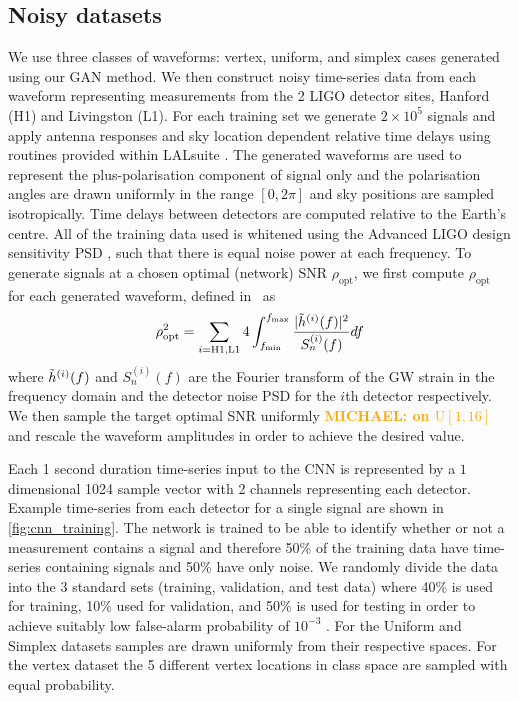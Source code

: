 \documentclass[12pt]{iopart}
\newcommand{\michael}[1]{\textbf{\textcolor{orange}{MICHAEL: #1}}}
\newcommand{\ndimensional}[1]{$#1$\nobreakdash\discretionary{-}{-}{-}dimensional}
\begin{document}
\subsection{Noisy datasets} 
We use three classes of waveforms: vertex, uniform, and simplex cases generated using our \ac{GAN} method. We then construct noisy time-series data from each waveform representing measurements from the 2 LIGO detector sites, Hanford (H1) and Livingston (L1). For each training set we generate $2\times 10^5$ signals and apply antenna responses and sky location dependent relative time delays using routines provided within LALsuite \cite{lalsuite}. The generated waveforms are used to represent the plus-polarisation component of signal only and the polarisation angles are drawn uniformly in the range $[0,2\pi]$ and sky positions are sampled isotropically. Time delays between detectors are computed relative to the Earth's centre. All of the training data used is whitened using the Advanced LIGO design sensitivity \ac{PSD} \cite{designcurve,observing-prospects}, such that there is equal noise power at each frequency. To generate  signals at a chosen optimal (network) \ac{SNR} $\rho_{\text{opt}}$, we first compute $\rho_{\text{opt}}$ for each generated waveform, defined in~\cite{PhysRevD.87.024033} as 
\begin{equation}
    \rho^2_{\text{opt}} = \sum_{i=\text{H1,L1}}4\int_{f_\text{min}}^{f_\text{max}} \frac{|\Tilde{h}^{(i)}(f)|^2}{S^{(i)}_{n} (f)} df
\end{equation}
where $\Tilde{h}^{(i)}(f)$ and $S^{(i)}_{n}(f)$ are the Fourier transform of the GW strain in the frequency domain and the detector noise \ac{PSD} for the $i$th detector respectively. We then sample the target optimal \ac{SNR} uniformly \michael{on $\textrm{U}[1, 16]$} and rescale the waveform amplitudes in order to achieve the desired value.

Each 1 second duration time-series input to the \ac{CNN} is represented by a \ndimensional{1} 1024 sample vector with 2 channels representing each detector. Example time-series from each detector for a single signal are shown in \cref{fig:cnn_training}. The network is trained to be able to identify whether or not a measurement contains a signal and therefore 50\% of the training data have time-series containing signals and 50\% have only noise. We randomly divide the data into the 3 standard sets (training, validation, and test data) where 40\% is used for training, 10\% used for validation, and 50\% is used for testing in order to achieve suitably low false-alarm probability of $10^{-3}$ . For the Uniform and Simplex datasets samples are drawn uniformly from their respective spaces. For the vertex dataset the 5 different vertex locations in class space are sampled with equal probability.  
\end{document}
